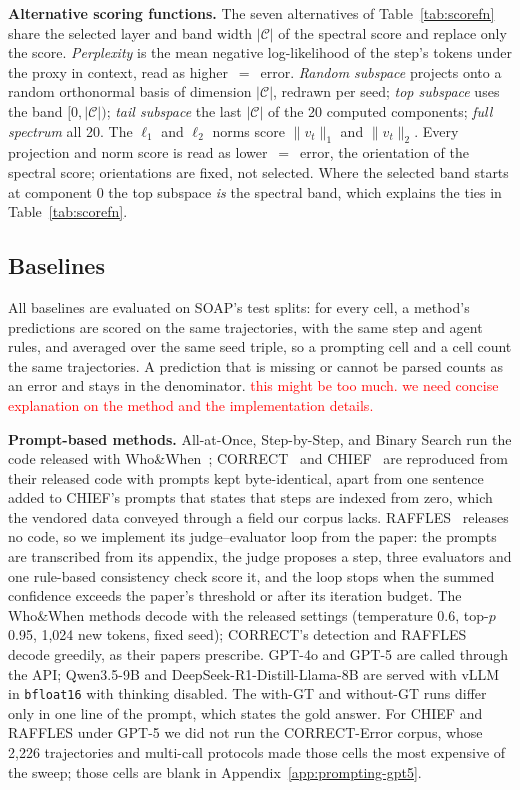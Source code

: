 \textbf{Alternative scoring functions.}
The seven alternatives of Table~\ref{tab:scorefn} share the selected layer and band
width $|\mathcal{C}|$ of the spectral score and replace only the score. \emph{Perplexity}
is the mean negative log-likelihood of the step's tokens under the proxy in context,
read as higher~$=$~error. \emph{Random subspace} projects onto a random orthonormal
basis of dimension $|\mathcal{C}|$, redrawn per seed; \emph{top subspace} uses the band
$[0, |\mathcal{C}|)$; \emph{tail subspace} the last $|\mathcal{C}|$ of the 20 computed
components; \emph{full spectrum} all 20. The $\ell_1$ and $\ell_2$ norms score
$\|v_t\|_1$ and $\|v_t\|_2$. Every projection and norm score is read as
lower~$=$~error, the orientation of the spectral score; orientations are fixed, not
selected. Where the selected band starts at component 0 the top subspace \emph{is}
the spectral band, which explains the ties in Table~\ref{tab:scorefn}.

\subsection{Baselines}
\label{app:baselines}

All baselines are evaluated on SOAP's test splits: for every cell, a method's
predictions are scored on the same trajectories, with the same step and agent rules,
and averaged over the same seed triple, so a prompting cell and a \soap{} cell count
the same trajectories. A prediction that is missing or cannot be parsed counts as an
error and stays in the denominator. \textcolor{red}{this might be too much. we need concise explanation on the method and the implementation details.}

\textbf{Prompt-based methods.}
All-at-Once, Step-by-Step, and Binary Search run the code released with
Who\&When~\citep{whoandwhen}; CORRECT~\citep{correct} and CHIEF~\citep{chief} are
reproduced from their released code with prompts kept byte-identical, apart from one
sentence added to CHIEF's prompts that states that steps are indexed from zero, which
the vendored data conveyed through a field our corpus lacks. RAFFLES~\citep{raffles}
releases no code, so we implement its judge--evaluator loop from the paper: the
prompts are transcribed from its appendix, the judge proposes a step, three
evaluators and one rule-based consistency check score it, and the loop stops when
the summed confidence exceeds the paper's threshold or after its iteration budget.
The Who\&When methods decode with the released settings (temperature 0.6, top-$p$
0.95, 1{,}024 new tokens, fixed seed); CORRECT's detection and RAFFLES decode
greedily, as their papers prescribe. GPT-4o and GPT-5 are called through the API;
Qwen3.5-9B and DeepSeek-R1-Distill-Llama-8B are served with vLLM in
\texttt{bfloat16} with thinking disabled. The with-GT and without-GT runs differ only
in one line of the prompt, which states the gold answer. For CHIEF and RAFFLES
under GPT-5 we did not run the CORRECT-Error corpus, whose 2{,}226 trajectories and
multi-call protocols made those cells the most expensive of the sweep; those cells
are blank in Appendix~\ref{app:prompting-gpt5}.

